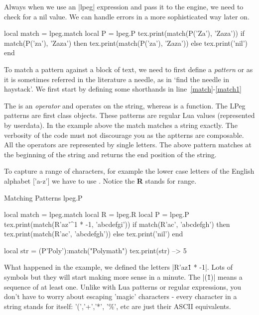 Always when we use an |lpeg| expression and pass it to the \tex engine, we need to check for a nil value. We can handle errors
in a more sophisticated way later on.


\begin{texexample}{}{}
\begin{luacode}
   local match = lpeg.match   
   local P = lpeg.P           
   tex.print(match(P('Za'), 'Zaza'))
   if match(P('za'), 'Zaza') then 
      tex.print(match(P('za'), 'Zaza')) 
   else tex.print('nil') 
   end
\end{luacode}
\end{texexample}

To match a pattern against a block of text, we need to first define a \emph{pattern} or as it is sometimes referred in the literature a needle, as in `find the needle in haystack'. We first start by defining some shorthands in line~\ref{match}-\ref{match1}



The  is an \emph{operator} and operates on the string, whereas  is a function. The LPeg patterns are first class objects. These patterns are regular Lua values (represented by userdata). In the example above the match matches a string exactly. The verbosity of the code must not discourage you as the aptterns are composable. All the operators are represented by single letters.  The above pattern matches at the beginning of the string and returns the end position of the string. 

To capture a range of characters, for example the lower case letters of the English alphabet  ['a-z'] we have to use . Notice the \textbf{R} stands for range.

\begin{texexample}{Matching Patterns lpeg.P}{}
\begin{luacode}
   local match = lpeg.match 
   local R = lpeg.R 
   local P = lpeg.P
   tex.print(match(R'az'^1 * -1, 'abcdefgi'))
   if match(R'ac', 'abcdefgh') then 
      tex.print(match(R'ac', 'abcdefgh')) 
   else 
      tex.print('nil') 
   end
   
local str =  (P'Poly'):match("Polymath")  
tex.print(str)  --> 5   
\end{luacode}
\end{texexample}

What happened in the example, we defined the letters |R'az\^1 * -1|. Lots of symbols but they will start making more sense in a minute. The  |(\^1)| means a sequence of at least one. Unlike with Lua patterns or regular expressions, you don't have to worry about escaping 'magic' characters - every character in a string stands for itself: '(','+','*', '\%', etc are just their ASCII equivalents. 

